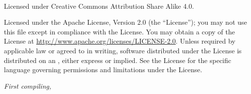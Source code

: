 \newpage
\begin{fullwidth}
~\vfill
\thispagestyle{empty}
\setlength{\parindent}{0pt}
\setlength{\parskip}{\baselineskip}

\par{}

\par Licensed under Creative Commons Attribution Share Alike 4.0.

\par{}

\par Licensed under the Apache License, Version 2.0 (the ``License''); you may not
use this file except in compliance with the License. You may obtain a copy
of the License at \url{http://www.apache.org/licenses/LICENSE-2.0}. Unless
required by applicable law or agreed to in writing, software distributed
under the License is distributed on an , either express or implied. See the
License for the specific language governing permissions and limitations
under the License.

\par\textit{First compiling, \monthyear}
\end{fullwidth}
